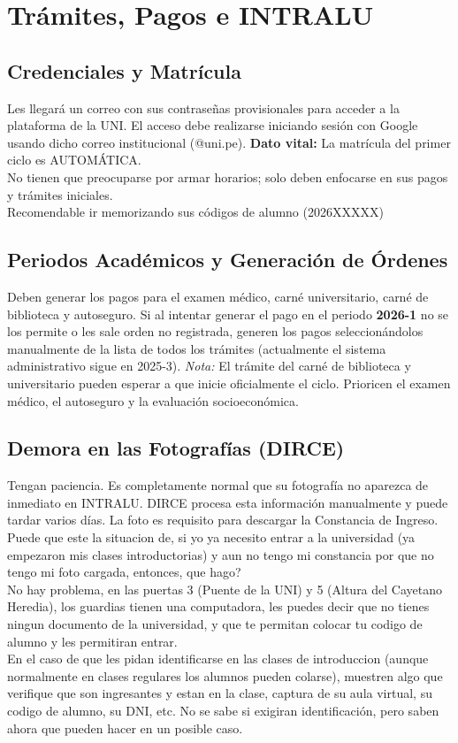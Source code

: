 \section{Trámites, Pagos e INTRALU}

\subsection{Credenciales y Matrícula}
Les llegará un correo con sus contraseñas provisionales para acceder a la plataforma de la UNI. El acceso debe realizarse iniciando sesión con Google usando dicho correo institucional (@uni.pe). \textbf{Dato vital:} La matrícula del primer ciclo es AUTOMÁTICA.\\
No tienen que preocuparse por armar horarios; solo deben enfocarse en sus pagos y trámites iniciales.\\
Recomendable ir memorizando sus códigos de alumno (2026XXXXX)

\subsection{Periodos Académicos y Generación de Órdenes}
Deben generar los pagos para el examen médico, carné universitario, carné de biblioteca y autoseguro. Si al intentar generar el pago en el periodo \textbf{2026-1} no se los permite o les sale orden no registrada, generen los pagos seleccionándolos manualmente de la lista de todos los trámites (actualmente el sistema administrativo sigue en 2025-3).
\textit{Nota:} El trámite del carné de biblioteca y universitario pueden esperar a que inicie oficialmente el ciclo. Prioricen el examen médico, el autoseguro y la evaluación socioeconómica.

\subsection{Demora en las Fotografías (DIRCE)}
Tengan paciencia. Es completamente normal que su fotografía no aparezca de inmediato en INTRALU. DIRCE procesa esta información manualmente y puede tardar varios días. La foto es requisito para descargar la Constancia de Ingreso.\\
Puede que este la situacion de, si yo ya necesito entrar a la universidad (ya empezaron mis clases introductorias) y aun no tengo mi constancia por que no tengo mi foto cargada, entonces, que hago?\\
No hay problema, en las puertas 3 (Puente de la UNI) y 5 (Altura del Cayetano Heredia), los guardias tienen una computadora, les puedes decir que no tienes ningun documento de la universidad, y que te permitan colocar tu codigo de alumno y les permitiran entrar.\\
En el caso de que les pidan identificarse en las clases de introduccion (aunque normalmente en clases regulares los alumnos pueden colarse), muestren algo que verifique que son ingresantes y estan en la clase, captura de su aula virtual, su codigo de alumno, su DNI, etc. No se sabe si exigiran identificación, pero saben ahora que pueden hacer en un posible caso.

